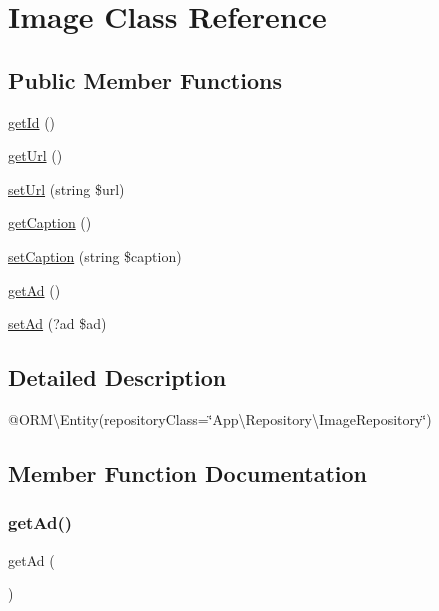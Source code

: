 \hypertarget{class_app_1_1_entity_1_1_image}{}\section{Image Class Reference}
\label{class_app_1_1_entity_1_1_image}
\subsection*{Public Member Functions}
\begin{DoxyCompactItemize}
\item 
\mbox{\hyperlink{class_app_1_1_entity_1_1_image_a12251d0c022e9e21c137a105ff683f13}{get\+Id}} ()
\item 
\mbox{\hyperlink{class_app_1_1_entity_1_1_image_accd14bda49a1044b4d8dd93f020f11ee}{get\+Url}} ()
\item 
\mbox{\hyperlink{class_app_1_1_entity_1_1_image_ad890855a744bb83f100ae399bab0579e}{set\+Url}} (string \$url)
\item 
\mbox{\hyperlink{class_app_1_1_entity_1_1_image_aac4626af46212fd81df1d779ec422b7c}{get\+Caption}} ()
\item 
\mbox{\hyperlink{class_app_1_1_entity_1_1_image_a8ad36f0a16f0ec6168ceba7bac6a3cc4}{set\+Caption}} (string \$caption)
\item 
\mbox{\hyperlink{class_app_1_1_entity_1_1_image_acbaadb0b5b6f7e8ad6a9a0854e7fbf4c}{get\+Ad}} ()
\item 
\mbox{\hyperlink{class_app_1_1_entity_1_1_image_a0250549281ce9f799f4dc9a74c36b830}{set\+Ad}} (?ad \$ad)
\end{DoxyCompactItemize}


\subsection{Detailed Description}
@\+O\+RM\textbackslash{}\+Entity(repository\+Class=\char`\"{}\+App\textbackslash{}\+Repository\textbackslash{}\+Image\+Repository\char`\"{}) 

\subsection{Member Function Documentation}
\mbox{\label{class_app_1_1_entity_1_1_image_acbaadb0b5b6f7e8ad6a9a0854e7fbf4c}} 
\subsubsection{\texorpdfstring{getAd()}{getAd()}}
{\footnotesize\ttfamily get\+Ad (\begin{DoxyParamCaption}{ }\end{DoxyParamCaption})}

